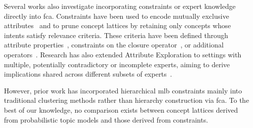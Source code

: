 Several works also investigate incorporating constraints or expert knowledge directly into \ac{fca}.
Constraints have been used to encode mutually exclusive attributes~\cite{hidayat_constrained_fca_2024}
and to prune concept lattices by retaining only concepts whose intents satisfy relevance criteria. These criteria have been defined through attribute properties~\cite{belohlavek2011selecting,belohlavek2009formal,hidayat_constrained_fca_2024}, constraints on the closure operator~\cite{belohlavek2006formal}, or additional operators~\cite{mao_constrained_fca_2017}. 
Research has also extended Attribute Exploration to settings with multiple, potentially contradictory or incomplete experts, aiming to derive implications shared across different subsets of experts~\cite{felde2021triadic,felde2022attribute}.

However, prior work has incorporated hierarchical \ac{mlb} constraints mainly into traditional clustering methods rather than hierarchy construction via \ac{fca}. 
To the best of our knowledge, no comparison exists between concept lattices derived from probabilistic topic models and those derived from constraints.